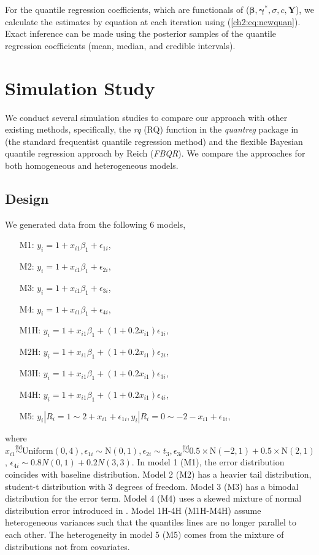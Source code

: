 \documentclass[12pt]{article}
\begin{document}
For the quantile regression coefficients, which are functionals of
($\bm \beta, \bm \gamma^{*}, \sigma, c, \bm Y$), we calculate the
estimates by equation at each iteration using
(\ref{ch2:eq:newquan}). Exact inference can be made using the posterior
samples of the quantile regression coefficients (mean, median, and
credible intervals).

\section{Simulation Study}
\label{ch2:sec:simulations}
We conduct several simulation studies to compare our approach with
other existing methods, specifically, the \textit{rq} (RQ) function in the
\textit{quantreg} package \citep{quantreg} in \cite{R} (the standard
frequentist quantile regression method) and the flexible Bayesian
quantile regression approach by Reich (\textit{FBQR}).  We compare the
approaches for both homogeneous and heterogeneous models.

\subsection{Design}
We generated data from the following 6 models,
\begin{itemize}
\item [M1:] $y_i = 1 + x_{i1}\beta_1 + \epsilon_{1i}$,
\item [M2:] $y_i = 1 + x_{i1}\beta_1 + \epsilon_{2i}$,
\item [M3:] $y_i = 1 + x_{i1}\beta_1 + \epsilon_{3i}$,
\item [M4:] $y_i = 1 + x_{i1}\beta_1 + \epsilon_{4i}$,
\item [M1H:] $y_i = 1 + x_{i1}\beta_1 + (1 + 0.2x_{i1})
  \epsilon_{1i}$,
\item [M2H:] $y_i = 1 + x_{i1}\beta_1 + (1 + 0.2x_{i1})
  \epsilon_{2i}$,
\item [M3H:] $y_i = 1 + x_{i1}\beta_1 + (1 + 0.2x_{i1})
  \epsilon_{3i}$,
\item [M4H:] $y_i = 1 + x_{i1}\beta_1 + (1 + 0.2x_{i1})
  \epsilon_{4i}$,
\item [M5:] $y_{i} | R_i = 1 \sim 2 + x_{i1} + \epsilon_{1i}, y_{i}|
  R_i = 0 \sim -2 - x_{i1} + \epsilon_{1i}$,
\end{itemize}
where $x_{i1} \stackrel{\mbox{iid}}{\sim} \mathrm{Uniform}(0,4),
\epsilon_{1i} \sim \mathrm{N}(0,1), \epsilon_{2i} \sim t_3,
\epsilon_{3i} \stackrel{\mbox{iid}}{\sim} 0.5 \times \mathrm{N}(-2,1)
+ 0.5 \times \mathrm{N}(2,1)$, $\epsilon_{4i} \sim 0.8 N(0,1) + 0.2
N(3,3)$. In model 1 (M1), the
error distribution coincides with baseline distribution. Model 2 (M2)
has a heavier tail distribution, student-t distribution with 3 degrees
of freedom. Model 3 (M3) has a bimodal distribution for the error
term.  Model 4 (M4) uses a skewed mixture of normal distribution error
introduced in \citet{reich2010}. Model 1H-4H (M1H-M4H) assume
heterogeneous variances such that the quantiles lines are no longer
parallel to each other. The heterogeneity in model 5 (M5)
 comes from the mixture of distributions
not from covariates.
\end{document}
